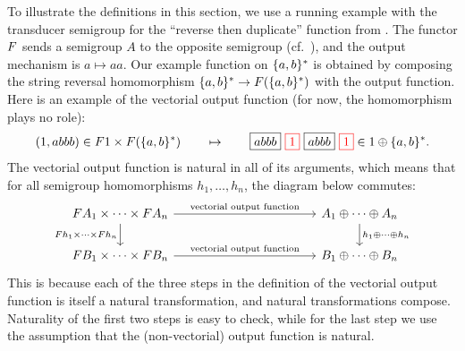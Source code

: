 To illustrate the definitions in this section, we use a running example with the
transducer semigroup for the \enquote{reverse then duplicate} function from
. The functor $\functor$ sends a semigroup $A$ to the
opposite semigroup (cf.~), and the output mechanism is $a
\mapsto aa$. Our example function on $\{a,b\}^*$ is obtained by composing the
string reversal homomorphism $\set{a,b}^* \to \functor(\set{a,b}^*)$ with the
output function. Here is an example of the vectorial output function (for now,
the homomorphism plays no role):
\begin{align*}
    (1,abbb) \in \functor 1 \times \functor(\set{a,b}^*) \qquad \mapsto \qquad 
  \boxed{abbb} \ \red{\boxed{1}} \  \boxed{abbb}\ \red{\boxed{1}} \in 1 \oplus \set{a,b}^*.
\end{align*}
The  vectorial output function is natural in all of its arguments, which means
that for all semigroup homomorphisms $h_1,\ldots,h_n$, the diagram below commutes:
\[
\begin{tikzcd}
    [column sep=4cm]
\functor A_1 \times \cdots \times \functor A_n
\ar[r,"\text{vectorial output function}"]
\ar[d,"\functor h_1 \times \cdots \times \functor h_n"']
&
A_1 \oplus \cdots \oplus A_n
\ar[d,"h_1 \oplus \cdots \oplus h_n"]
\\
\functor B_1 \times \cdots \times \functor B_n
\ar[r,"\text{vectorial output function}"]
&
B_1 \oplus \cdots \oplus B_n
\end{tikzcd}
\]
This is because each of the three steps in the definition of the vectorial output function is itself a natural transformation, and natural transformations compose.  Naturality of the first two steps is easy to check, while for the last step we use the assumption that the (non-vectorial) output function is natural.



